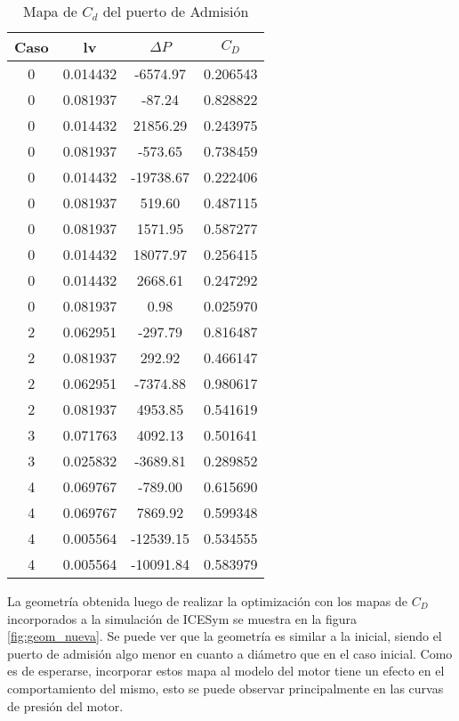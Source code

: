 \begin{table}
  \centering
  \begin{tabular}{cccc} \toprule
      Caso  & lv        & $\Delta P$    & $C_{D}$   \\ \midrule
      0     & 0.014432  & -6574.97      &  0.206543 \\
      0     & 0.081937  & -87.24        &  0.828822 \\
      0     & 0.014432  & 21856.29      &  0.243975 \\
      0     & 0.081937  & -573.65       &  0.738459 \\
      0     & 0.014432  & -19738.67     &  0.222406 \\
      0     & 0.081937  & 519.60        &  0.487115 \\
      0     & 0.081937  & 1571.95       &  0.587277 \\
      0     & 0.014432  & 18077.97      &  0.256415 \\
      0     & 0.014432  & 2668.61       &  0.247292 \\
      0     & 0.081937  & 0.98          &  0.025970 \\
      2     & 0.062951  & -297.79       &  0.816487 \\
      2     & 0.081937  & 292.92        &  0.466147 \\
      2     & 0.062951  & -7374.88      &  0.980617 \\
      2     & 0.081937  & 4953.85       &  0.541619 \\
      3     & 0.071763  & 4092.13       &  0.501641 \\
      3     & 0.025832  & -3689.81      &  0.289852 \\
      4     & 0.069767  & -789.00       &  0.615690 \\
      4     & 0.069767  & 7869.92       &  0.599348 \\
      4     & 0.005564  & -12539.15     &  0.534555 \\
      4     & 0.005564  & -10091.84     &  0.583979 \\ \bottomrule
    \end{tabular}
  \caption{Mapa de $C_d$ del puerto de Admisión} \label{tab:mapa_cd_admision}
\end{table}

La geometría obtenida luego de realizar la optimización con los mapas de $C_D$
incorporados a la simulación de ICESym se muestra en la figura \ref{fig:geom_nueva}.
%
Se puede ver que la geometría es similar a la inicial, siendo el puerto de
admisión algo menor en cuanto a diámetro que en el caso inicial.
%
Como es de esperarse, incorporar estos mapa al modelo del motor tiene un efecto
en el comportamiento del mismo, esto se puede observar principalmente en las
curvas de presión del motor.

